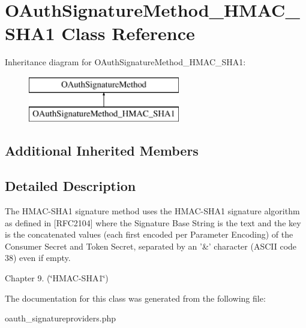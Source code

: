 \hypertarget{class_o_auth_signature_method___h_m_a_c___s_h_a1}{\section{O\-Auth\-Signature\-Method\-\_\-\-H\-M\-A\-C\-\_\-\-S\-H\-A1 Class Reference}
\label{class_o_auth_signature_method___h_m_a_c___s_h_a1}
}
Inheritance diagram for O\-Auth\-Signature\-Method\-\_\-\-H\-M\-A\-C\-\_\-\-S\-H\-A1\-:\begin{figure}[H]
\begin{center}
\leavevmode
\includegraphics[height=2.000000cm]{class_o_auth_signature_method___h_m_a_c___s_h_a1}
\end{center}
\end{figure}
\subsection*{Additional Inherited Members}


\subsection{Detailed Description}
The H\-M\-A\-C-\/\-S\-H\-A1 signature method uses the H\-M\-A\-C-\/\-S\-H\-A1 signature algorithm as defined in \mbox{[}R\-F\-C2104\mbox{]} where the Signature Base String is the text and the key is the concatenated values (each first encoded per Parameter Encoding) of the Consumer Secret and Token Secret, separated by an '\&' character (A\-S\-C\-I\-I code 38) even if empty.
\begin{DoxyItemize}
\item Chapter 9. (\char`\"{}\-H\-M\-A\-C-\/\-S\-H\-A1\char`\"{}) 
\end{DoxyItemize}

The documentation for this class was generated from the following file\-:\begin{DoxyCompactItemize}
\item 
oauth\-\_\-signatureproviders.\-php\end{DoxyCompactItemize}
